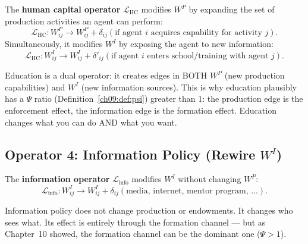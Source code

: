 \documentclass[../structural_economics_book.tex]{subfiles}
\begin{document}
\begin{definition}\label{ch15:def:hc}
The \textbf{human capital operator} $\mathcal{L}_{\text{HC}}$ modifies $W^P$ by expanding the set of production activities an agent can perform:
\begin{equation}\label{ch15:eq:hc}
\mathcal{L}_{\text{HC}}: W^P_{ij} \to W^P_{ij} + \delta_{ij}(\text{if agent } i \text{ acquires capability for activity } j).
\end{equation}
Simultaneously, it modifies $W^I$ by exposing the agent to new information:
\begin{equation}
\mathcal{L}_{\text{HC}}: W^I_{ij} \to W^I_{ij} + \delta'_{ij}(\text{if agent } i \text{ enters school/training with agent } j).
\end{equation}
\end{definition}

Education is a dual operator: it creates edges in BOTH $W^P$ (new production capabilities) and $W^I$ (new information sources). This is why education plausibly has a $\Psi$ ratio (Definition~\ref{ch09:def:psi}) greater than 1: the production edge is the enforcement effect, the information edge is the formation effect. Education changes what you can do AND what you want.


\subsection{Operator 4: Information Policy (Rewire $W^I$)}

\begin{definition}\label{ch15:def:info}
The \textbf{information operator} $\mathcal{L}_{\text{info}}$ modifies $W^I$ without changing $W^P$:
\begin{equation}\label{ch15:eq:info}
\mathcal{L}_{\text{info}}: W^I_{ij} \to W^I_{ij} + \delta_{ij}(\text{media, internet, mentor program, ...}).
\end{equation}
\end{definition}

Information policy does not change production or endowments. It changes who sees what. Its effect is entirely through the formation channel --- but as Chapter~10 showed, the formation channel can be the dominant one ($\Psi > 1$).
\end{document}

